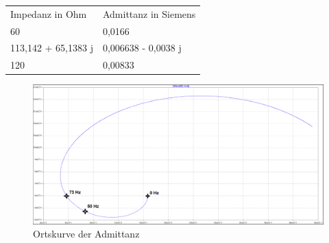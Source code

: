 \documentclass[%
  a4paper, %
  12pt, %
   article, %
  titlepage
]{scrartcl}
\begin{document}
\begin{tabular}{ll}
Impedanz in Ohm& Admittanz in Siemens\\
60  & 0,0166  \\
113,142 + 65,1383 j & 0,006638 - 0,0038 j  \\
120  & 0,00833  \\
\end{tabular}

\begin{figure}[H]
\includegraphics[width=\textwidth]{plot3.png}
\caption{Ortskurve der Admittanz}
\label{fig9}
\end{figure}
\end{document}
